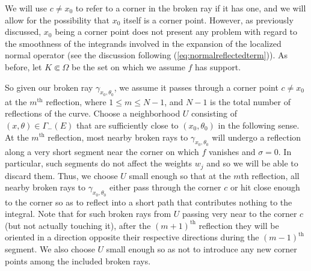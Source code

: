 \documentclass[10pt]{amsart}
\theoremstyle{definition}
\theoremstyle{definition}
\theoremstyle{definition}
\begin{document}
We will use $c \neq x_{0}$ to refer to a corner in the broken ray if it has one, and we will allow for the possibility that $x_{0}$ itself is a corner point. However, as previously discussed, $x_{0}$ being a corner point does not present any problem with regard to the smoothness of the integrands involved in the expansion of the localized normal operator (see the discussion following (\ref{eq:normalreflectedterm})). As before, let $K \Subset \Omega$ be the set on which we assume $f$ has support. 

So given our broken ray $\gamma_{x_{0},\theta_{0}}$, we assume it passes through a corner point $c \neq x_{0}$ at the $m^{\mathrm{th}}$ reflection, where $1 \leq m \leq N-1$, and $N-1$ is the total number of reflections of the curve. Choose a neighborhood $U$ consisting of $(x,\theta) \in \Gamma_{-}(E)$ that are sufficiently close to $(x_{0},\theta_{0})$ in the following sense. At the $m^{\mathrm{th}}$ reflection, most nearby broken rays to $\gamma_{x_{0},\theta_{0}}$ will undergo a reflection along a very short segment near the corner on which $f$ vanishes and $\sigma = 0$. In particular, such segments do not affect the weights $w_{j}$ and so we will be able to discard them. Thus, we choose $U$ small enough so that at the $m$th reflection, all nearby broken rays to $\gamma_{x_{0},\theta_{0}}$ either pass through the corner $c$ or hit close enough to the corner so as to reflect into a short path that contributes nothing to the integral. Note that for such broken rays from $U$ passing very near to the corner $c$ (but not actually touching it), after the $(m+1)^{\mathrm{th}}$ reflection they will be oriented in a direction opposite their respective directions during the $(m-1)^{\mathrm{th}}$ segment. We also choose $U$ small enough so as not to introduce any new corner points among the included broken rays.
\end{document}
